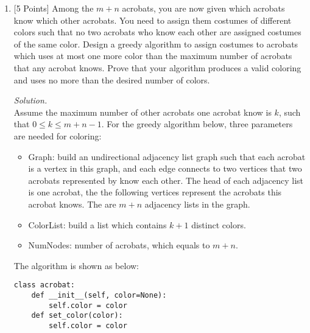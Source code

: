 \documentclass[10pt]{article}
\begin{document}
\begin{enumerate}[label=(\alph*)]
\begin{mdframed}
\begin{enumerate}
       \end{enumerate}
    \end{mdframed}
    \item {[5 Points]} Among the $m + n$ acrobats, you are now given which acrobats know which other acrobats. You need to assign them costumes of different colors such that no two acrobats who know each other are assigned costumes of the same color. Design a greedy algorithm to assign costumes to acrobats which uses at most one more color than the maximum number of acrobats that any acrobat knows. Prove that your algorithm produces a valid coloring and uses no more than the desired number of colors.
    \begin{mdframed}
        \textit{Solution.}\\
       Assume the maximum number of other acrobats one acrobat know is $k$, such that $0 \leq k \leq m + n - 1$.
        For the greedy algorithm below, three parameters are needed for coloring:
        \begin{itemize}
            \item Graph: build an undirectional adjacency list graph such that each acrobat is a vertex in this graph, and each edge connects to two vertices that two acrobats represented by know each other. The head of each adjacency list is one acrobat, the the following vertices represent the acrobats this acrobat knows. The are $m + n$ adjacency lists in the graph.
            \item ColorList: build a list which contains $k + 1$ distinct colors.
            \item NumNodes: number of acrobats, which equals to $m + n$.
        \end{itemize}
        The algorithm is shown as below:\\
        \lstset{language=Python}
        \begin{lstlisting}
class acrobat:
    def __init__(self, color=None):
        self.color = color
    def set_color(color):
        self.color = color


\end{lstlisting}
\end{mdframed}
\end{enumerate}
\end{document}
